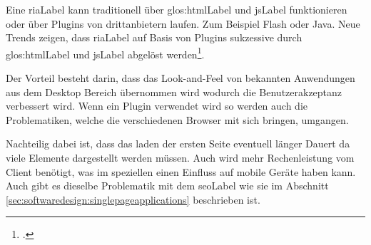 Eine \gls{riaLabel} kann traditionell über \Gls{glos:htmlLabel} und \gls{jsLabel} funktionieren oder über Plugins von drittanbietern laufen. Zum Beispiel Flash oder Java. Neue Trends zeigen, dass \gls{riaLabel} auf Basis von Plugins sukzessive durch \Gls{glos:htmlLabel} und \gls{jsLabel} abgelöst werden\footcite{Rich_Internet_Application_Market_Share_Global_Usage_2015-06-07}.

Der Vorteil besteht darin, dass das Look-and-Feel von bekannten Anwendungen aus dem Desktop Bereich übernommen wird wodurch die Benutzerakzeptanz verbessert wird. Wenn ein Plugin verwendet wird so werden auch die Problematiken, welche die verschiedenen Browser mit sich bringen, umgangen. 

Nachteilig dabei ist, dass das laden der ersten Seite eventuell länger Dauert da viele Elemente dargestellt werden müssen. Auch wird mehr Rechenleistung vom Client benötigt, was im speziellen einen Einfluss auf mobile Geräte haben kann. Auch gibt es dieselbe Problematik mit dem \gls{seoLabel} wie sie im Abschnitt \ref{sec:softwaredesign:singlepageapplications}  beschrieben ist.